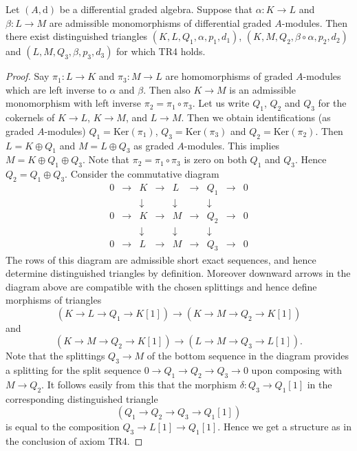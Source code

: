 \begin{lemma}
\label{lemma-two-split-injections}
Let $(A, \text{d})$ be a differential graded algebra. Suppose that
$\alpha : K \to L$ and $\beta : L \to M$ are admissible monomorphisms
of differential graded $A$-modules. Then there exist distinguished triangles
$(K, L, Q_1, \alpha, p_1, d_1)$, $(K, M, Q_2, \beta \circ \alpha, p_2, d_2)$
and $(L, M, Q_3, \beta, p_3, d_3)$ for which TR4 holds.
\end{lemma}

\begin{proof}
Say $\pi_1 : L \to K$ and $\pi_3 : M \to L$ are homomorphisms
of graded $A$-modules which are left inverse to $\alpha$ and $\beta$.
Then also $K \to M$ is an admissible monomorphism with left
inverse $\pi_2 = \pi_1 \circ \pi_3$. Let us write $Q_1$, $Q_2$
and $Q_3$ for the cokernels of $K \to L$, $K \to M$, and $L \to M$.
Then we obtain identifications (as graded $A$-modules)
$Q_1 = \text{Ker}(\pi_1)$, $Q_3 = \text{Ker}(\pi_3)$ and
$Q_2 = \text{Ker}(\pi_2)$. Then $L = K \oplus Q_1$ and
$M = L \oplus Q_3$ as graded $A$-modules. This implies
$M = K \oplus Q_1 \oplus Q_3$. Note that $\pi_2 = \pi_1 \circ \pi_3$
is zero on both $Q_1$ and $Q_3$. Hence $Q_2 = Q_1 \oplus Q_3$.
Consider the commutative diagram
$$
\begin{matrix}
0 & \to & K & \to & L & \to & Q_1 & \to & 0 \\
  &     & \downarrow&     & \downarrow&     & \downarrow  & \\
0 & \to & K & \to & M & \to & Q_2 & \to & 0 \\
  &     & \downarrow&     & \downarrow&     & \downarrow  & \\
0 & \to & L & \to & M & \to & Q_3 & \to & 0
\end{matrix}
$$
The rows of this diagram are admissible short exact sequences, and
hence determine distinguished triangles by definition. Moreover
downward arrows in the diagram above are compatible with the chosen
splittings and hence define morphisms of triangles
$$
(K \to L \to Q_1 \to K[1])
\longrightarrow
(K \to M \to Q_2 \to K[1])
$$
and
$$
(K \to M \to Q_2 \to K[1])
\longrightarrow
(L \to M \to Q_3 \to L[1]).
$$
Note that the splittings $Q_3 \to M$ of the bottom sequence in the
diagram provides a splitting for the split sequence
$0 \to Q_1 \to Q_2 \to Q_3 \to 0$ upon composing with $M \to Q_2$.
It follows easily from this that the morphism $\delta : Q_3 \to Q_1[1]$
in the corresponding distinguished triangle
$$
(Q_1 \to Q_2 \to Q_3 \to Q_1[1])
$$
is equal to the composition $Q_3 \to L[1] \to Q_1[1]$.
Hence we get a structure as in the conclusion of axiom TR4.
\end{proof}

